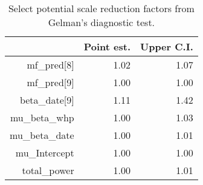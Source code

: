 \begin{table}[h]
\centering
\begin{tabular}{rrr}
  \hline
 & Point est. & Upper C.I. \\ 
  \hline
mf\_pred[8] & 1.02 & 1.07 \\ 
  mf\_pred[9] & 1.00 & 1.00 \\ 
  beta\_date[9] & 1.11 & 1.42 \\ 
  mu\_beta\_whp & 1.00 & 1.03 \\ 
  mu\_beta\_date & 1.00 & 1.01 \\ 
  mu\_Intercept & 1.00 & 1.00 \\ 
  total\_power & 1.00 & 1.01 \\ 
   \hline
\end{tabular}
\caption{Select potential scale reduction factors from Gelman's diagnostic test.} 
\label{tab:gelman}
\end{table}
